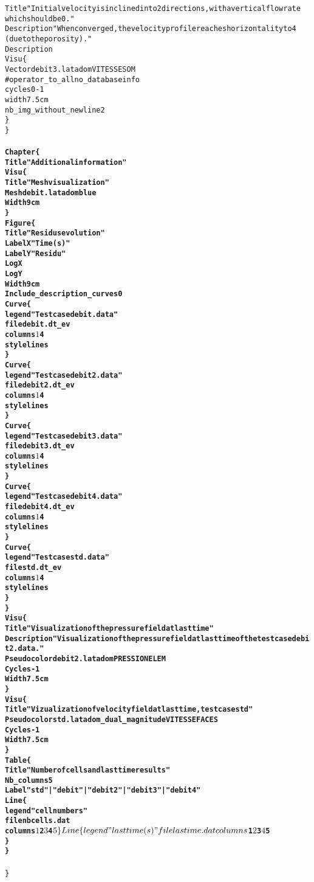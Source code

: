 \begin{alltt}
        Title "Initial velocity is inclined into 2 directions, with a vertical flow rate 
            which should be 0."
        Description "When converged, the velocity profile reaches horizontality to 4 
            (due to the porosity) ."
        Description
        Visu \{
                Vector debit3.lata dom VITESSE SOM
                # operator_to_all no_databaseinfo
                cycles 0 -1
                width 7.5cm
                nb_img_without_newline 2 
        \}
\}
{\bf{
Chapter \{
        Title "Additional information"
        Visu \{
                Title "Mesh visualization"
                Mesh debit.lata dom blue
                Width 9cm
        \}
        Figure \{
                Title "Residus evolution"
                LabelX "Time (s)"
                LabelY "Residu"
                LogX
                LogY
                Width 9cm
                Include_description_curves 0
                Curve \{
                        legend "Test case debit.data"
                        file debit.dt_ev
                        columns $1 $4
                        style lines
                \}
                Curve \{
                        legend "Test case debit2.data"
                        file debit2.dt_ev
                        columns $1 $4
                        style lines
                \}
                Curve \{
                        legend "Test case debit3.data"
                        file debit3.dt_ev
                        columns $1 $4
                        style lines
                \}
                Curve \{
                        legend "Test case debit4.data"
                        file debit4.dt_ev
                        columns $1 $4
                        style lines
                \}
                Curve \{
                        legend "Test case std.data"
                        file std.dt_ev
                        columns $1 $4
                        style lines
                \}
        \}
        Visu \{
                Title "Visualization of the pressure field at last time"
                Description "Visualization of the pressure field at last time of the test case debit2.data."
                Pseudocolor debit2.lata dom PRESSION ELEM
                Cycles -1
                Width 7.5cm
        \}
        Visu \{
                Title "Vizualization of velocity field at last time, test case std"
                Pseudocolor std.lata dom_dual_magnitude VITESSE FACES
                Cycles -1
                Width 7.5cm
        \}
        Table \{
                Title "Number of cells and last time results"
                Nb_columns 5
                Label "std" | "debit" | "debit2" | "debit3" | "debit4"
                Line \{
                        legend "cell numbers"
                        file nbcells.dat
                        columns $1 $2 $3 $4 $5
                \}
                Line \{
                        legend "last time (s)"
                        file lastime.dat
                        columns $1 $2 $3 $4 $5
                \}
        \}
}}
\}
\end{alltt}
